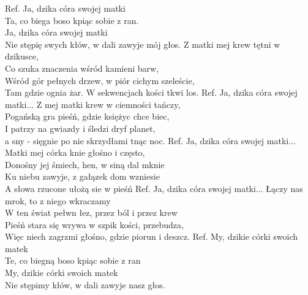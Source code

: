 
Ref. Ja, dzika córa swojej matki\\
 Ta, co biega boso kpiąc sobie z ran.\\
 Ja, dzika córa swojej matki\\
 Nie stępię swych kłów, w dali zawyje mój głos.
\hops
Z matki mej krew tętni w dzikusce,\\
Co szuka znaczenia wśród kamieni barw,\\
Wśród gór pełnych drzew, w piór cichym szeleście,\\
Tam gdzie ognia żar. W sekwencjach kości tkwi los.
\hops
Ref. Ja, dzika córa swojej matki...
\hops
Z mej matki krew w ciemności tańczy,\\
Pogańską gra pieśń, gdzie księżyc chce biec,\\
I patrzy na gwiazdy i śledzi dryf planet,\\
a sny - sięgnie po nie skrzydłami tnąc noc.
\hops
Ref. Ja, dzika córa swojej matki...
\hops
Matki mej córka knie głośno i często,\\
Donośny jej śmiech, hen, w siną dal mknie\\
Ku niebu zawyje, z gałązek dom wzniesie\\
A słowa rzucone ułożą sie w pieśń
\hops
Ref. Ja, dzika córa swojej matki...
\hops
Łączy nas mrok, to z niego wkraczamy\\
W ten świat pełwn łez, przez ból i przez krew\\
Pieśń stara się wrywa w szpik kości, przebudza,\\
Więc niech zagrzmi głośno, gdzie piorun i deszcz.
\hops
Ref. My, dzikie córki swoich matek\\
 Te, co biegną boso kpiąc sobie z ran\\
 My, dzikie córki swoich matek\\
 Nie stępimy kłów, w dali zawyje nasz głos.